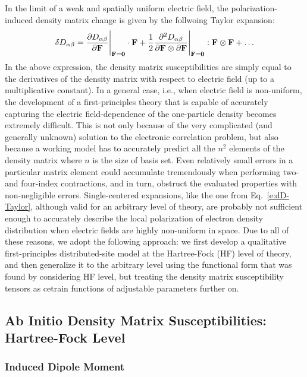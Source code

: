\documentclass[aip,amsmath,amssymb,reprint,floatfix]{revtex4-1}
\begin{document}
In the limit of a weak and spatially uniform electric field,
the polarization\hyp{}induced density matrix change is given by the follwoing Taylor expansion:
%
\begin{equation}\label{e:dD-Taylor}
 \delta D_{\alpha\beta} = \frac{\partial D_{\alpha\beta}}{\partial {\bf F}}\Bigg|_{{\bf F}={\bf 0}}  \cdot {\bf F} 
   + \frac{1}{2} 
     \frac{\partial^2 D_{\alpha\beta}}{\partial {\bf F} \otimes \partial {\bf F}}\Bigg|_{{\bf F}={\bf 0}} : {\bf F} \otimes {\bf F}
   + \ldots 
\end{equation}
%
In the above expression, the density matrix susceptibilities are simply equal to the derivatives of the density matrix
with respect to electric field (up to a multiplicative constant).
In a general case, i.e., when electric field is non\hyp{}uniform, the development of a first\hyp{}principles theory
that is capable of accurately capturing the electric field\hyp{}dependence of the one\hyp{}particle density
becomes extremely difficult. This is not only because of the very complicated (and generally unknown) solution
to the electronic correlation problem, but also because
a working model has to accurately predict all the $n^2$ elements of the density matrix
where $n$ is the size of basis set. Even relatively small errors
in a particular matrix element could accumulate tremendously when performing two\hyp{}
and four\hyp{}index contractions,
and in turn, obstruct the evaluated properties with non\hyp{}negligible errors.
Single\hyp{}centered expansions, like the one from Eq.~\eqref{e:dD-Taylor}, although valid for 
an arbitrary level of theory,
are probably not sufficient enough to accurately describe the local polarization
of electron density distribution when electric fields are highly non\hyp{}uniform in space.
Due to all of these reasons, we adopt the following approach: 
we first develop a qualitative first\hyp{}principles distributed\hyp{}site model at the Hartree\hyp{}Fock (HF)
level of theory, and then generalize it to the arbitrary level using the functional form that was found 
by considering HF level,
but treating the density matrix susceptibility tensors as cetrain functions of adjustable parameters further on.

\subsection{Ab Initio Density Matrix Susceptibilities: Hartree-Fock Level}

\subsubsection{Induced Dipole Moment}
\end{document}
